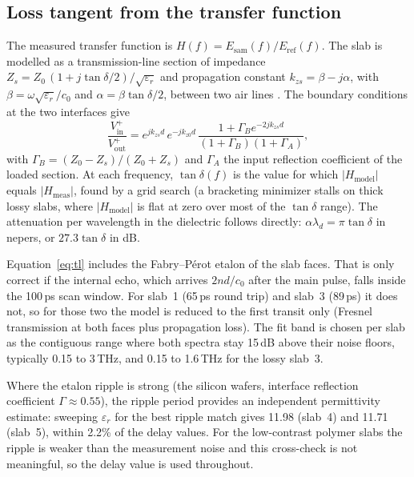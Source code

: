 \documentclass[conference]{IEEEtran}
\begin{document}
\subsection{Loss tangent from the transfer function}
The measured transfer function is $H(f) = E_{\mathrm{sam}}(f)/E_{\mathrm{ref}}(f)$. The slab is modelled as a transmission-line section of impedance $Z_s = Z_0\,(1 + j\tan\delta/2)/\sqrt{\varepsilon_r}$ and propagation constant $k_{zs} = \beta - j\alpha$, with $\beta = \omega\sqrt{\varepsilon_r}/c_0$ and $\alpha = \beta\tan\delta/2$, between two air lines \cite{proc}. The boundary conditions at the two interfaces give
\begin{equation}
\frac{V^+_{\mathrm{in}}}{V^+_{\mathrm{out}}}
= e^{jk_{zs}d}\,e^{-jk_{z0}d}\,
  \frac{1 + \Gamma_B e^{-2jk_{zs}d}}{(1+\Gamma_B)(1+\Gamma_A)},
\label{eq:tl}
\end{equation}
with $\Gamma_B = (Z_0 - Z_s)/(Z_0 + Z_s)$ and $\Gamma_A$ the input reflection coefficient of the loaded section. At each frequency, $\tan\delta(f)$ is the value for which $|H_{\mathrm{model}}|$ equals $|H_{\mathrm{meas}}|$, found by a grid search (a bracketing minimizer stalls on thick lossy slabs, where $|H_{\mathrm{model}}|$ is flat at zero over most of the $\tan\delta$ range). The attenuation per wavelength in the dielectric follows directly: $\alpha\lambda_d = \pi\tan\delta$ in nepers, or $27.3\tan\delta$ in dB.

Equation~\eqref{eq:tl} includes the Fabry--P\'erot etalon of the slab faces. That is only correct if the internal echo, which arrives $2nd/c_0$ after the main pulse, falls inside the 100\,ps scan window. For slab~1 (65\,ps round trip) and slab~3 (89\,ps) it does not, so for those two the model is reduced to the first transit only (Fresnel transmission at both faces plus propagation loss). The fit band is chosen per slab as the contiguous range where both spectra stay 15\,dB above their noise floors, typically 0.15 to 3\,THz, and 0.15 to 1.6\,THz for the lossy slab~3.

Where the etalon ripple is strong (the silicon wafers, interface reflection coefficient $\Gamma \approx 0.55$), the ripple period provides an independent permittivity estimate: sweeping $\varepsilon_r$ for the best ripple match gives 11.98 (slab~4) and 11.71 (slab~5), within 2.2\% of the delay values. For the low-contrast polymer slabs the ripple is weaker than the measurement noise and this cross-check is not meaningful, so the delay value is used throughout.
\end{document}

